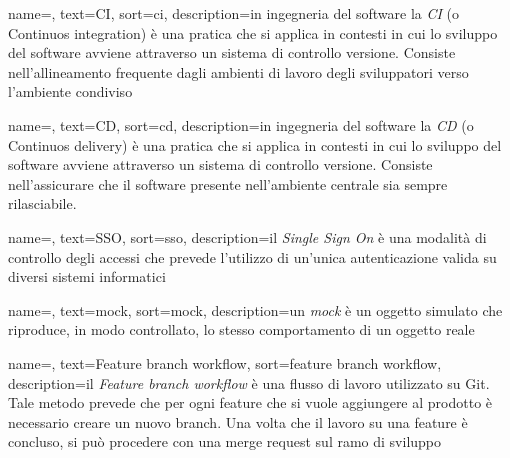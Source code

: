 {
    name=,
    text=CI,
    sort=ci,
    description={in ingegneria del software la \emph{CI} (o Continuos integration) è una pratica che si applica in contesti in cui lo sviluppo del software avviene attraverso un sistema di controllo versione. Consiste nell'allineamento frequente dagli ambienti di lavoro degli sviluppatori verso l'ambiente condiviso}
}

{
    name=,
    text=CD,
    sort=cd,
    description={in ingegneria del software la \emph{CD} (o Continuos delivery) è una pratica che si applica in contesti in cui lo sviluppo del software avviene attraverso un sistema di controllo versione. Consiste nell'assicurare che il software presente nell'ambiente centrale sia sempre rilasciabile.}
}

{
    name=,
    text=SSO,
    sort=sso,
    description={il \emph{Single Sign On} è una modalità di controllo degli accessi che prevede l'utilizzo di un'unica autenticazione valida su diversi sistemi informatici}
}

{
    name=,
    text=mock,
    sort=mock,
    description={un \emph{mock} è un oggetto simulato che riproduce, in modo controllato, lo stesso comportamento di un oggetto reale}
}

{
    name=,
    text=Feature branch workflow,
    sort=feature branch workflow,
    description={il \emph{Feature branch workflow} è una flusso di lavoro utilizzato su Git. Tale metodo prevede che per ogni feature che si vuole aggiungere al prodotto è necessario creare un nuovo branch. Una volta che il lavoro su una feature è concluso, si può procedere con una merge request sul ramo di sviluppo}
}